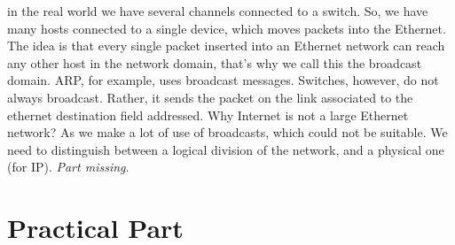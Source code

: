 in the real world we have several channels connected to 
a switch. So, we have many hosts connected to a single 
device, which moves packets into the Ethernet. The idea 
is that every single packet inserted into an Ethernet
network can reach any other host in the network domain, 
that's why we call this the broadcast domain. ARP, for 
example, uses broadcast messages. \newline 
Switches, however, 
do not always broadcast. Rather, it sends the packet 
on the link associated to the ethernet destination field 
addressed. Why Internet is not a large Ethernet network?
As we make a lot of use of broadcasts, which could not 
be suitable. We need to distinguish between a logical 
division of the network, and a physical one (for IP). \newline 
\textit{Part missing}. 

\section{Practical Part}

